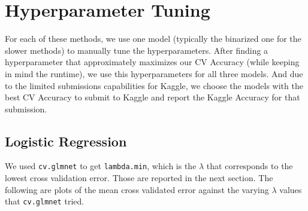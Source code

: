 \documentclass{article}
\begin{document}

\section{Hyperparameter Tuning}
For each of these methods, we use one model (typically the binarized one for the slower methods) to manually tune the hyperparameters. After finding a hyperparameter that approximately maximizes our CV Accuracy (while keeping in mind the runtime), we use this hyperparameters for all three models. And due to the limited submissions capabilities for Kaggle, we choose the models with the best CV Accuracy to submit to Kaggle and report the Kaggle Accuracy for that submission. 

\subsection{Logistic Regression}
We used \texttt{cv.glmnet} to get \texttt{lambda.min}, which is the $\lambda$ that corresponds to the lowest cross validation error. Those are reported in the next section. The following are plots of the mean cross validated error against the varying $\lambda$ values that \texttt{cv.glmnet} tried. \\
\end{document}

